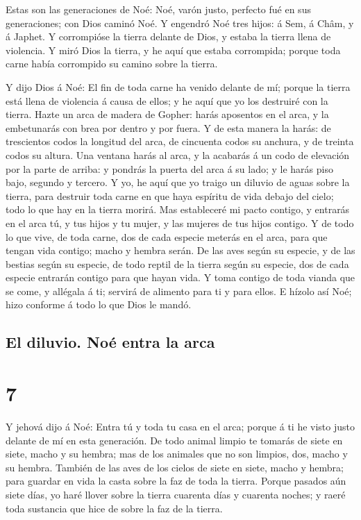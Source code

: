  Estas son las generaciones de Noé: Noé, varón justo,
perfecto fué en sus generaciones; con Dios caminó Noé.  Y
engendró Noé tres hijos: á Sem, á Châm, y á Japhet.  Y
corrompióse la tierra delante de Dios, y estaba la tierra llena de
violencia.  Y miró Dios la tierra, y he aquí que estaba
corrompida; porque toda carne había corrompido su camino sobre la
tierra.

 Y dijo Dios á Noé: El fin de toda carne ha venido delante
de mí; porque la tierra está llena de violencia á causa de ellos; y he
aquí que yo los destruiré con la tierra.  Hazte un arca de
madera de Gopher: harás aposentos en el arca, y la embetunarás con brea
por dentro y por fuera.  Y de esta manera la harás: de
trescientos codos la longitud del arca, de cincuenta codos su anchura, y
de treinta codos su altura.  Una ventana harás al arca, y
la acabarás á un codo de elevación por la parte de arriba: y pondrás la
puerta del arca á su lado; y le harás piso bajo, segundo y tercero.
 Y yo, he aquí que yo traigo un diluvio de aguas sobre la
tierra, para destruir toda carne en que haya espíritu de vida debajo del
cielo; todo lo que hay en la tierra morirá.  Mas
estableceré mi pacto contigo, y entrarás en el arca tú, y tus hijos y tu
mujer, y las mujeres de tus hijos contigo.  Y de todo lo
que vive, de toda carne, dos de cada especie meterás en el arca, para
que tengan vida contigo; macho y hembra serán.  De las aves
según su especie, y de las bestias según su especie, de todo reptil de
la tierra según su especie, dos de cada especie entrarán contigo para
que hayan vida.  Y toma contigo de toda vianda que se come,
y allégala á ti; servirá de alimento para ti y para ellos. 
E hízolo así Noé; hizo conforme á todo lo que Dios le mandó.

\hypertarget{el-diluvio.-nouxe9-entra-la-arca}{%
\subsection{El diluvio. Noé entra la
arca}\label{el-diluvio.-nouxe9-entra-la-arca}}

\hypertarget{section-6}{%
\section{7}\label{section-6}}

 Y jehová dijo á Noé: Entra tú y toda tu casa en el arca;
porque á ti he visto justo delante de mí en esta generación.
 De todo animal limpio te tomarás de siete en siete, macho y
su hembra; mas de los animales que no son limpios, dos, macho y su
hembra.  También de las aves de los cielos de siete en
siete, macho y hembra; para guardar en vida la casta sobre la faz de
toda la tierra.  Porque pasados aún siete días, yo haré
llover sobre la tierra cuarenta días y cuarenta noches; y raeré toda
sustancia que hice de sobre la faz de la tierra.

